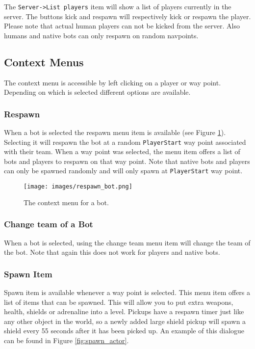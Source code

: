 \documentclass[11pt,a4paper]{article}
\begin{document}

The \texttt{Server->List players} item will show a list of players currently in the server. The buttons kick and respawn will respectively kick or respawn the player. Please note that actual human players can not be kicked from the server. Also humans and native bots can only respawn on random navpoints.


\subsection{Context Menus}
 The context menu is accessible by left clicking on a player or way point. Depending on which is selected different options are available.

%
\subsubsection*{Respawn}
%
When a bot is selected the respawn menu item is available (see Figure \ref{fig:respawn_actor}). Selecting it will respawn the bot at a random \texttt{PlayerStart} way point associated with their team. When a way point was selected, the menu item offers a list of bots and players to respawn on that way point. Note that native bots and players can only be spawned randomly and will only spawn at \texttt{PlayerStart} way point.

\begin{figure}[h!]
\centering
\texttt{[image: images/respawn\_bot.png]}
\caption{The context menu for a bot.}\label{fig:respawn_actor}
\end{figure}

\subsubsection*{Change team of a Bot}

When a bot is selected, using the change team menu item will change the team of the bot. Note that again this does not work for players and native bots.


%
\subsubsection*{Spawn Item}
%
Spawn item is available whenever a way point is selected. This menu item offers a list of items that can be spawned. This will allow you to put extra weapons, health, shields or adrenaline into a level. Pickups have a respawn timer just like any other object in the world, so a newly added large shield pickup will spawn a shield every 55 seconds after it has been picked up. An example of this dialogue can be found in Figure \ref{fig:spawn_actor}.
\end{document}
